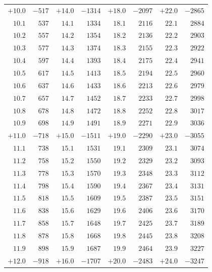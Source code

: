 \begin{center}
{\begin{tabular}{r|r||r|r||r|r||r|r}
$+10.0$ & $-517$ & $+14.0$ & $-1314$ & $+18.0$ & $-2097$ & $+22.0$ & $-2865$\\
$10.1$ & $537$ & $14.1$ & $1334$ & $18.1$ & $2116$ & $22.1$ & $2884$\\
$10.2$ & $557$ & $14.2$ & $1354$ & $18.2$ & $2136$ & $22.2$ & $2903$\\
$10.3$ & $577$ & $14.3$ & $1374$ & $18.3$ & $2155$ & $22.3$ & $2922$\\
$10.4$ & $597$ & $14.4$ & $1393$ & $18.4$ & $2175$ & $22.4$ & $2941$\\
$10.5$ & $617$ & $14.5$ & $1413$ & $18.5$ & $2194$ & $22.5$ & $2960$\\
$10.6$ & $637$ & $14.6$ & $1433$ & $18.6$ & $2213$ & $22.6$ & $2979$\\
$10.7$ & $657$ & $14.7$ & $1452$ & $18.7$ & $2233$ & $22.7$ & $2998$\\
$10.8$ & $678$ & $14.8$ & $1472$ & $18.8$ & $2252$ & $22.8$ & $3017$\\
$10.9$ & $698$ & $14.9$ & $1491$ & $18.9$ & $2271$ & $22.9$ & $3036$\\[4pt]
$+11.0$ & $-718$ & $+15.0$ & $-1511$ & $+19.0$ & $-2290$ & $+23.0$ & $-3055$\\
$11.1$ & $738$ & $15.1$ & $1531$ & $19.1$ & $2309$ & $23.1$ & $3074$\\
$11.2$ & $758$ & $15.2$ & $1550$ & $19.2$ & $2329$ & $23.2$ & $3093$\\
$11.3$ & $778$ & $15.3$ & $1570$ & $19.3$ & $2348$ & $23.3$ & $3112$\\
$11.4$ & $798$ & $15.4$ & $1590$ & $19.4$ & $2367$ & $23.4$ & $3131$\\
$11.5$ & $818$ & $15.5$ & $1609$ & $19.5$ & $2387$ & $23.5$ & $3151$\\
$11.6$ & $838$ & $15.6$ & $1629$ & $19.6$ & $2406$ & $23.6$ & $3170$\\
$11.7$ & $858$ & $15.7$ & $1648$ & $19.7$ & $2425$ & $23.7$ & $3189$\\
$11.8$ & $878$ & $15.8$ & $1668$ & $19.8$ & $2445$ & $23.8$ & $3208$\\
$11.9$ & $898$ & $15.9$ & $1687$ & $19.9$ & $2464$ & $23.9$ & $3227$\\[4pt]
$+12.0$ & $-918$ & $+16.0$ & $-1707$ & $+20.0$ & $-2483$ & $+24.0$ & $-3247$
\end{tabular}}
\end{center}
\clearpage{}%
